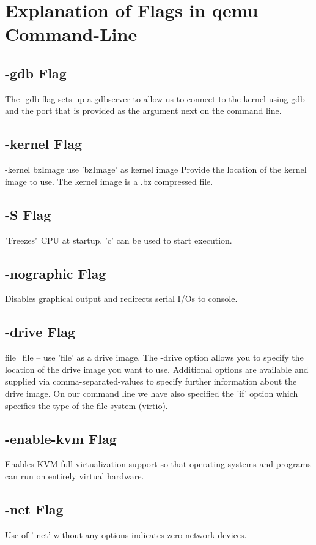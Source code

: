 \documentclass{article}
\begin{document}
\section{Explanation of Flags in qemu Command-Line}
\label{sec:flags}

\subsection{-gdb Flag}
The -gdb flag sets up a gdbserver to allow us to connect to the kernel using gdb and the port that is provided as the argument next on the command line.

\subsection{-kernel Flag}
-kernel bzImage use 'bzImage' as kernel image
Provide the location of the kernel image to use. The kernel image is a .bz compressed file.

\subsection{-S Flag}
"Freezes" CPU at startup. 'c' can be used to start execution.

\subsection{-nographic Flag}
Disables graphical output and redirects serial I/Os to console.  

\subsection{-drive Flag}
file=file -- use 'file' as a drive image.
The -drive option allows you to specify the location of the drive image you want to use. Additional options are available and supplied via comma-separated-values to specify further information about the drive image. On our command line we have also specified the 'if' option which specifies the type of the file system (virtio).

\subsection{-enable-kvm Flag}
Enables KVM full virtualization support so that operating systems and programs can run on entirely virtual hardware.

\subsection{-net Flag}
Use of '-net' without any options indicates zero network devices.
\end{document}
